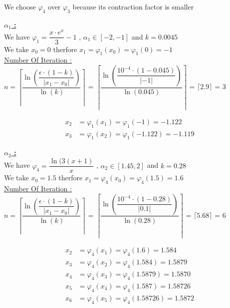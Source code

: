 We choose \(\varphi_4\) over \(\varphi_3\) because its contraction factor is smaller

\vspace{1cm}

\textbf{\underline{\(\alpha_1\) :}}\\[0.15cm]
We have \(\varphi_1 = \dfrac{x\cdot e^{x}}{3} - 1\) , \(\alpha_1 \in [-2,-1]\) and \(k = 0.0045\)\\[0.1cm]
We take \(x_0 = 0\) therfore \(x_1 = \varphi_1(x_0) = \varphi_1(0) = -1\)\\[0.35cm]
\underline{Number Of Iteration :}\\[0.25cm]
\(n =  \left\lceil \dfrac{\ln\left(\dfrac{\epsilon \cdot (1-k)}{|x_1 - x_0|}\right)}{\ln(k)}\right\rceil\)  =  \(\left\lceil \dfrac{\ln\left(\dfrac{10^{-4} \cdot (1-0.045)}{|-1|}\right)}{\ln(0.045)}\right\rceil\) = \(\lceil 2.9 \rceil\) = 3  
\newpage

\begin{align*}
    x_2 &= \varphi_1(x_1) = \varphi_1(-1) = -1.122\\
    x_3 &= \varphi_1(x_2) = \varphi_1(-1.122) = -1.119
\end{align*}

\vspace{1cm}

\textbf{\underline{\(\alpha_2\) :}}\\[0.15cm]
We have \(\varphi_4 = \dfrac{\ln(3(x+1)}{x}\) , \(\alpha_2 \in [1.45,2]\) and \(k = 0.28\)\\[0.1cm]
We take \(x_0 = 1.5\) therfore \(x_1 = \varphi_4(x_0) = \varphi_4(1.5) = 1.6\)\\[0.35cm]
\underline{Number Of Iteration :}\\[0.25cm]
\(n =  \left\lceil \dfrac{\ln\left(\dfrac{\epsilon \cdot (1-k)}{|x_1 - x_0|}\right)}{\ln(k)}\right\rceil\)  =  \(\left\lceil \dfrac{\ln\left(\dfrac{10^{-4} \cdot (1-0.28)}{|0.1|}\right)}{\ln(0.28)}\right\rceil\) = \(\lceil 5.68 \rceil\) = 6  

\vspace{0.5cm}

\begin{align*}
    x_2 &= \varphi_4(x_1) = \varphi_4(1.6) = 1.584\\
    x_3 &= \varphi_4(x_2) = \varphi_4(1.584) = 1.5879\\
    x_4 &= \varphi_4(x_3) = \varphi_4(1.5879) = 1.5870\\
    x_5 &= \varphi_4(x_4) = \varphi_4(1.587) = 1.58726\\
    x_6 &= \varphi_4(x_5) = \varphi_4(1.58726) = 1.5872
\end{align*}

